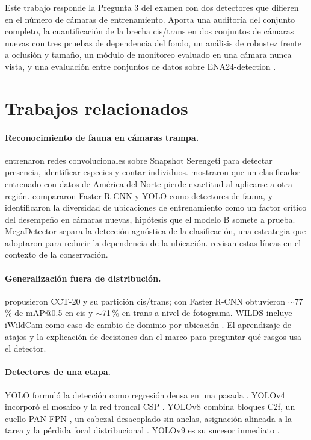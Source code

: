 \documentclass{article}
\begin{document}
Este trabajo responde la Pregunta 3 del examen con dos detectores que difieren en el número de cámaras de entrenamiento. Aporta una auditoría del conjunto completo, la cuantificación de la brecha cis/trans en dos conjuntos de cámaras nuevas con tres pruebas de dependencia del fondo, un análisis de robustez frente a oclusión y tamaño, un módulo de monitoreo evaluado en una cámara nunca vista, y una evaluación entre conjuntos de datos sobre ENA24-detection \parencite{yousif2019}.

\section{Trabajos relacionados}
\label{sec:relacionados}
\paragraph{Reconocimiento de fauna en cámaras trampa.} \Textcite{norouzzadeh2018} entrenaron redes convolucionales sobre Snapshot Serengeti para detectar presencia, identificar especies y contar individuos. \Textcite{tabak2019} mostraron que un clasificador entrenado con datos de América del Norte pierde exactitud al aplicarse a otra región. \Textcite{schneider2018} compararon Faster R-CNN y YOLO como detectores de fauna, y \textcite{schneider2020} identificaron la diversidad de ubicaciones de entrenamiento como un factor crítico del desempeño en cámaras nuevas, hipótesis que el modelo B somete a prueba. MegaDetector \parencite{beery2019megadetector} separa la detección agnóstica de la clasificación, una estrategia que \textcite{shepley2021} adoptaron para reducir la dependencia de la ubicación. \Textcite{tuia2022} revisan estas líneas en el contexto de la conservación.

\paragraph{Generalización fuera de distribución.} \Textcite{beery2018} propusieron CCT-20 y su partición cis/trans; con Faster R-CNN obtuvieron \(\sim\)77\,\% de mAP@0.5 en cis y \(\sim\)71\,\% en trans a nivel de fotograma. WILDS incluye iWildCam como caso de cambio de dominio por ubicación \parencite{koh2021}. El aprendizaje de atajos \parencite{geirhos2020} y la explicación de decisiones \parencite{ribeiro2016,selvaraju2017} dan el marco para preguntar qué rasgos usa el detector.

\paragraph{Detectores de una etapa.} YOLO formuló la detección como regresión densa en una pasada \parencite{redmon2016}. YOLOv4 incorporó el mosaico y la red troncal CSP \parencite{bochkovskiy2020,wang2020cspnet}. YOLOv8 \parencite{jocher2023} combina bloques C2f, un cuello PAN-FPN \parencite{lin2017fpn,liu2018pan}, un cabezal desacoplado sin anclas, asignación alineada a la tarea \parencite{feng2021tood} y la pérdida focal distribucional \parencite{li2020gfl}. YOLOv9 \parencite{wang2024yolov9} es su sucesor inmediato \parencite{terven2023}.
\end{document}
